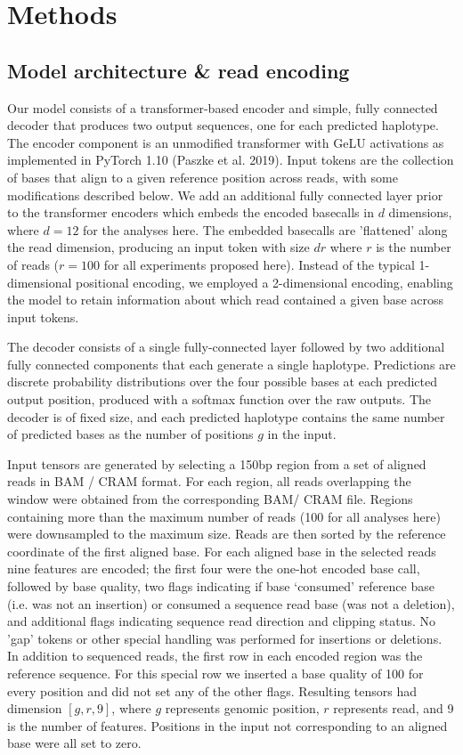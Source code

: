 \documentclass[]{article}
\begin{document}
\section{Methods}

\subsection{Model architecture \& read encoding}

Our model consists of a transformer-based encoder and simple, fully connected decoder that produces two output sequences, one for each predicted haplotype. The encoder component is an unmodified transformer with GeLU activations as implemented in PyTorch 1.10 (Paszke et al. 2019). Input tokens are the collection of bases that align to a given reference position across reads, with some modifications described below. We add an additional fully connected layer prior to the transformer encoders which embeds the encoded basecalls in $d$ dimensions, where $d=12$ for the analyses here. The embedded basecalls are 'flattened' along the read dimension, producing an input token with size $dr$ where $r$ is the number of reads ($r=100$ for all experiments proposed here).  Instead of the typical 1-dimensional positional encoding, we employed a 2-dimensional encoding, enabling the model to retain information about which read contained a given base across input tokens. 

The decoder consists of a single fully-connected layer followed by two additional fully connected components that each generate a single haplotype. Predictions are discrete probability distributions over the four possible bases at each predicted output position, produced with a softmax function over the raw outputs. The decoder is of fixed size, and each predicted haplotype contains the same number of predicted bases as the number of positions $g$ in the input. 

Input tensors are generated by selecting a 150bp region from a set of aligned reads in BAM / CRAM format. For each region, all reads overlapping the window were obtained from the corresponding BAM/ CRAM file. Regions containing more than the maximum number of reads (100 for all analyses here) were downsampled to the maximum size.  Reads are then sorted by the reference coordinate of the first aligned base. For each aligned base in the selected reads nine features are encoded; the first four were the one-hot encoded base call, followed by base quality, two flags indicating if base `consumed' reference base (i.e. was not an insertion) or consumed a sequence read base (was not a deletion), and additional flags indicating sequence read direction and clipping status.  No 'gap' tokens or other special handling was performed for insertions or deletions. In addition to sequenced reads, the first row in each encoded region was the reference sequence. For this special row we inserted a base quality of 100 for every position and did not set any of the other flags. Resulting tensors had dimension $[g, r, 9]$, where $g$ represents genomic position, $r$ represents read, and 9 is the number of features. Positions in the input not corresponding to an aligned base were all set to zero. 
\end{document}
